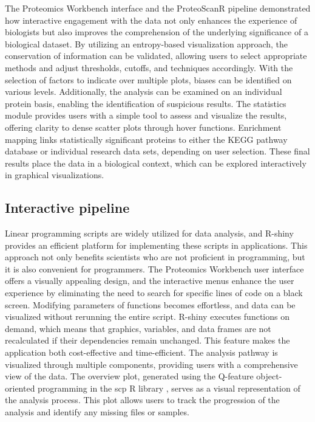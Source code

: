 \documentclass[
  11pt,
]{article}
\begin{document}
The Proteomics Workbench interface and the ProteoScanR pipeline
demonstrated how interactive engagement with the data not only enhances
the experience of biologists but also improves the comprehension of the
underlying significance of a biological dataset. By utilizing an
entropy-based visualization approach, the conservation of information
can be validated, allowing users to select appropriate methods and
adjust thresholds, cutoffs, and techniques accordingly. With the
selection of factors to indicate over multiple plots, biases can be
identified on various levels. Additionally, the analysis can be examined
on an individual protein basis, enabling the identification of
suspicious results. The statistics module provides users with a simple
tool to assess and visualize the results, offering clarity to dense
scatter plots through hover functions. Enrichment mapping links
statistically significant proteins to either the KEGG pathway database
or individual research data sets, depending on user selection. These
final results place the data in a biological context, which can be
explored interactively in graphical visualizations.

\hypertarget{interactive-pipeline}{%
\subsection{Interactive pipeline}\label{interactive-pipeline}}

Linear programming scripts are widely utilized for data analysis, and
R-shiny provides an efficient platform for implementing these scripts in
applications. This approach not only benefits scientists who are not
proficient in programming, but it is also convenient for programmers.
The Proteomics Workbench user interface offers a visually appealing
design, and the interactive menus enhance the user experience by
eliminating the need to search for specific lines of code on a black
screen. Modifying parameters of functions becomes effortless, and data
can be visualized without rerunning the entire script. R-shiny executes
functions on demand, which means that graphics, variables, and data
frames are not recalculated if their dependencies remain unchanged. This
feature makes the application both cost-effective and time-efficient.
The analysis pathway is visualized through multiple components,
providing users with a comprehensive view of the data. The overview
plot, generated using the Q-feature object-oriented programming in the
scp R library \citep{Vanderaa2021}, serves as a visual representation of
the analysis process. This plot allows users to track the progression of
the analysis and identify any missing files or samples.
\end{document}
